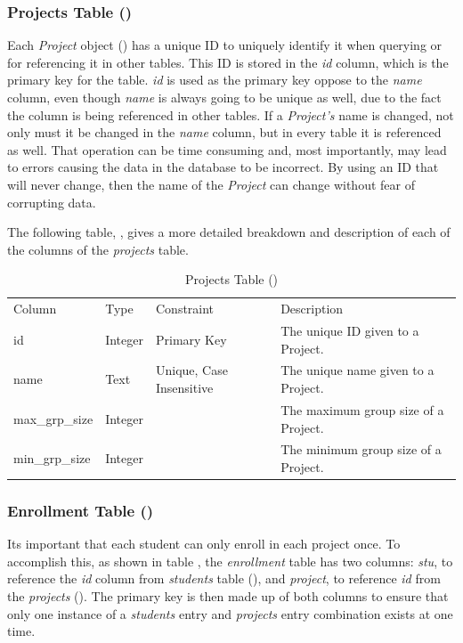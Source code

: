 \documentclass[12pt,letterpaper]{article}
\begin{document}
\subsubsection*{Projects Table ()}
Each \textit{Project} object () has a unique ID to uniquely identify it when querying or for referencing it in other tables. This ID is stored in the \textit{id} column, which is the primary key for the table. \textit{id} is used as the primary key oppose to the \textit{name} column, even though \textit{name} is always going to be unique as well, due to the fact the column is being referenced in other tables. If a \textit{Project's} name is changed, not only must it be changed in the \textit{name} column, but in every table it is referenced as well. That operation can be time consuming and, most importantly, may lead to errors causing the data in the database to be incorrect. By using an ID that will never change, then the name of the \textit{Project} can change without fear of corrupting data.

The following table, , gives a more detailed breakdown and description of each of the columns of the \textit{projects} table.

\begin{table}[H]
	\caption{Projects Table ()} 
	\begin{tabu} to \textwidth {l l X X[3]}
		\tableheader{}Column & Type & Constraint & Description \\
		id             & Integer & Primary Key      & The unique ID given to a Project. \\
		name           & Text    & Unique,\newline 
		                           Case Insensitive & The unique name given to a Project. \\
		max\_grp\_size & Integer &                  & The maximum group size of a Project. \\
		min\_grp\_size & Integer &                  & The minimum group size of a Project. \\
	\end{tabu}
\end{table}

\subsubsection*{Enrollment Table ()}
Its important that each student can only enroll in each project once. To accomplish this, as shown in table , the \textit{enrollment} table has two columns: \textit{stu}, to reference the \textit{id} column from \textit{students} table (), and \textit{project}, to reference \textit{id} from the \textit{projects} (). The primary key is then made up of both columns to ensure that only one instance of a \textit{students} entry and \textit{projects} entry combination exists at one time.
\end{document}

